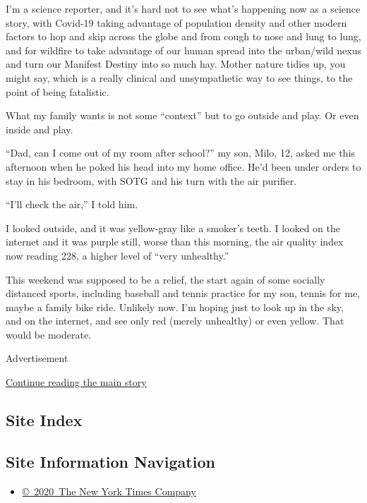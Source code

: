 I'm a science reporter, and it's hard not to see what's happening now as
a science story, with Covid-19 taking advantage of population density
and other modern factors to hop and skip across the globe and from cough
to nose and lung to lung, and for wildfire to take advantage of our
human spread into the urban/wild nexus and turn our Manifest Destiny
into so much hay. Mother nature tidies up, you might say, which is a
really clinical and unsympathetic way to see things, to the point of
being fatalistic.

What my family wants is not some ``context'' but to go outside and play.
Or even inside and play.

``Dad, can I come out of my room after school?'' my son, Milo, 12, asked
me this afternoon when he poked his head into my home office. He'd been
under orders to stay in his bedroom, with SOTG and his turn with the air
purifier.

``I'll check the air,'' I told him.

I looked outside, and it was yellow-gray like a smoker's teeth. I looked
on the internet and it was purple still, worse than this morning, the
air quality index now reading 228, a higher level of ``very unhealthy.''

This weekend was supposed to be a relief, the start again of some
socially distanced sports, including baseball and tennis practice for my
son, tennis for me, maybe a family bike ride. Unlikely now. I'm hoping
just to look up in the sky, and on the internet, and see only red
(merely unhealthy) or even yellow. That would be moderate.

Advertisement

\protect\hyperlink{after-bottom}{Continue reading the main story}

\hypertarget{site-index}{%
\subsection{Site Index}\label{site-index}}

\hypertarget{site-information-navigation}{%
\subsection{Site Information
Navigation}\label{site-information-navigation}}

\begin{itemize}
\tightlist
\item
  \href{https://help.nytimes3xbfgragh.onion/hc/en-us/articles/115014792127-Copyright-notice}{©~2020~The
  New York Times Company}
\end{itemize}

